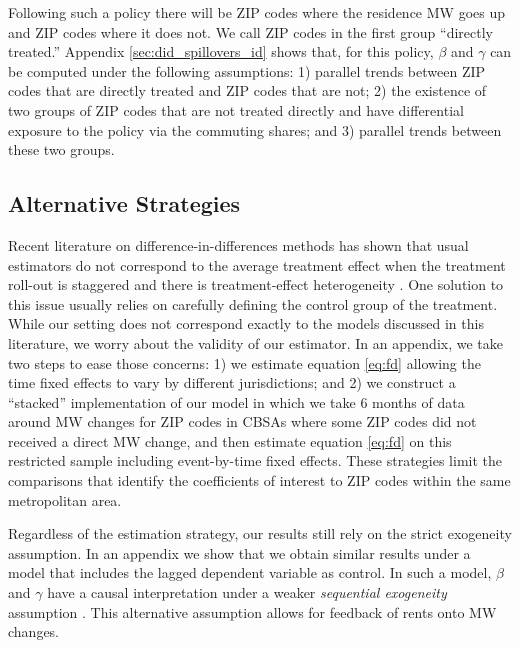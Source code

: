 Following such a policy there will be ZIP codes where the residence MW goes up
and ZIP codes where it does not.
We call ZIP codes in the first group ``directly treated.''
Appendix \ref{sec:did_spillovers_id} shows that, for this policy, 
$\beta$ and $\gamma$ can be computed under the following assumptions: 
1) parallel trends between ZIP codes that are directly treated and ZIP codes 
that are not;
2) the existence of two groups of ZIP codes that are not treated directly and
have differential exposure to the policy via the commuting shares; and 
3) parallel trends between these two groups.


\subsection{Alternative Strategies}\label{sec:alt_emp_strategies}

Recent literature on difference-in-differences methods has shown that usual
estimators do not correspond to the average treatment effect when the treatment 
roll-out is staggered and there is treatment-effect heterogeneity 
\parencite{deChaisemartinEtAl2022,RothEtAl2022}.
One solution to this issue usually relies on carefully defining the control
group of the treatment.
While our setting does not correspond exactly to the models discussed in this
literature, we worry about the validity of our estimator.
In an appendix, we take two steps to ease those concerns:
1) we estimate equation \eqref{eq:fd} allowing the time fixed effects to vary
by different jurisdictions; and
2) we construct a ``stacked'' implementation of our model in which we take
6 months of data around MW changes for ZIP codes in CBSAs where some ZIP codes 
did not received a direct MW change, and then estimate equation \eqref{eq:fd} on
this restricted sample including event-by-time fixed effects.
These strategies limit the comparisons that identify the coefficients of 
interest to ZIP codes within the same metropolitan area.

Regardless of the estimation strategy, our results still rely on the 
strict exogeneity assumption.
In an appendix we show that we obtain similar results under a model that 
includes the lagged dependent variable as control.
In such a model, $\beta$ and $\gamma$ have a causal interpretation under a 
weaker \textit{sequential exogeneity} assumption
\parencite{ArellanoBond1991, ArellanoHonore2001}.
This alternative assumption allows for feedback of rents onto MW changes.
